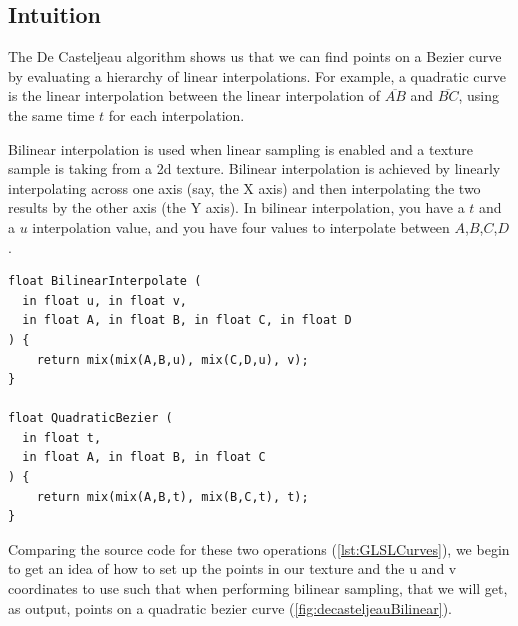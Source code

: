 \documentclass{jcgt}
\begin{document}
\subsection{Intuition}

The De Casteljeau algorithm shows us that we can find points on a Bezier curve by evaluating a hierarchy of linear interpolations.  For example, a quadratic curve is the linear interpolation between the linear interpolation of {$\overline{AB}$} and {$\overline{BC}$}, using the same time $t$ for each interpolation.

Bilinear interpolation is used when linear sampling is enabled and a texture sample is taking from a 2d texture.  Bilinear interpolation is achieved by linearly interpolating across one axis (say, the X axis) and then interpolating the two results by the other axis (the Y axis).  In bilinear interpolation, you have a $t$ and a $u$ interpolation value, and you have four values to interpolate between $A$,$B$,$C$,$D$.

\begin{lstlisting}[caption={GLSL implementation of bilinear interpolation and the De Casteljeau algorithm for a quadratic Bezier curve.}, label={lst:GLSLCurves}]
float BilinearInterpolate (
  in float u, in float v,
  in float A, in float B, in float C, in float D
) {
    return mix(mix(A,B,u), mix(C,D,u), v);
}

float QuadraticBezier (
  in float t,
  in float A, in float B, in float C
) {
    return mix(mix(A,B,t), mix(B,C,t), t);
}
\end{lstlisting}

Comparing the source code for these two operations  (\autoref{lst:GLSLCurves}), we begin to get an idea of how to set up the points in our texture and the u and v coordinates to use such that when performing bilinear sampling, that we will get, as output, points on a quadratic bezier curve (\autoref{fig:decasteljeauBilinear}).
\end{document}
